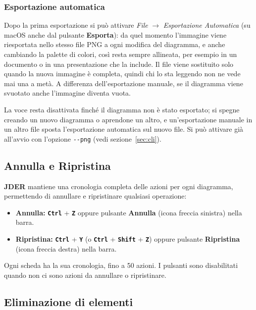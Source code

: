 \documentclass[a4paper,11pt]{article}
\newcommand{\key}[1]{\texttt{\textbf{#1}}}
\newcommand{\menu}[1]{\textit{#1}}
\newcommand{\uielement}[1]{\textbf{#1}}
\newcommand{\jder}{\textbf{JDER}}
\begin{document}
\subsubsection{Esportazione automatica}
\label{sec:autoexport}

Dopo la prima esportazione si può attivare \menu{File} $\to$ \menu{Esportazione Automatica} (su
macOS anche dal pulsante \uielement{Esporta}): da quel momento l'immagine viene riesportata nello
stesso file PNG a ogni modifica del diagramma, e anche cambiando la palette di colori, così resta
sempre allineata, per esempio in un documento o in una presentazione che la include. Il file viene
sostituito solo quando la nuova immagine è completa, quindi chi lo sta leggendo non ne vede mai
una a metà. A differenza dell'esportazione manuale, se il diagramma viene svuotato anche
l'immagine diventa vuota.

La voce resta disattivata finché il diagramma non è stato esportato; si spegne creando un nuovo
diagramma o aprendone un altro, e un'esportazione manuale in un altro file sposta l'esportazione
automatica sul nuovo file. Si può attivare già all'avvio con l'opzione \texttt{-{}-png} (vedi
sezione~\ref{sec:cli}).

\subsection{Annulla e Ripristina}

\jder{} mantiene una cronologia completa delle azioni per ogni diagramma, permettendo di
annullare e ripristinare qualsiasi operazione:

\begin{itemize}
  \item \textbf{Annulla:} \key{Ctrl} + \key{Z} oppure pulsante \uielement{Annulla} (icona freccia sinistra) nella barra.
  \item \textbf{Ripristina:} \key{Ctrl} + \key{Y} (o \key{Ctrl} + \key{Shift} + \key{Z}) oppure
        pulsante \uielement{Ripristina} (icona freccia destra) nella barra.
\end{itemize}

Ogni scheda ha la sua cronologia, fino a 50 azioni. I pulsanti sono disabilitati quando non ci
sono azioni da annullare o ripristinare.

\subsection{Eliminazione di elementi}
\end{document}
